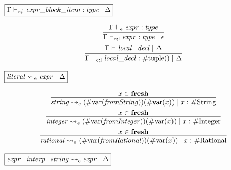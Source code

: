 $\fbox{$\Gamma \vdash_{\mathrm{e}; \mathrm{l}} \mathit{expr\_block\_item}: \mathit{type} \mid \Delta$}$

\begin{gather*}
    \infer{\Gamma \vdash_{\mathrm{e}; \mathrm{l}} \mathit{expr}: \mathit{type} \mid \epsilon}{
        \Gamma \vdash_\mathrm{e} \mathit{expr}: \mathit{type}
    }
    \\
    \infer{\Gamma \vdash_{\mathrm{e}; \mathrm{l}} \mathit{local\_decl}: \mathrm{\#tuple}() \mid \Delta}{
        \Gamma \vdash \mathit{local\_decl} \mid \Delta
    }
\end{gather*}

$\fbox{$\mathit{literal} \rightsquigarrow_\mathrm{e} \mathit{expr} \mid \Delta$}$

\begin{gather*}
    \infer{\mathit{string} \rightsquigarrow_\mathrm{e} (\mathrm{\#var}(\mathit{fromString}))(\mathrm{\#var}(x)) \mid x: \mathrm{\#String}}{
        x \in \mathbf{fresh}
    }
    \\
    \infer{\mathit{integer} \rightsquigarrow_\mathrm{e} (\mathrm{\#var}(\mathit{fromInteger}))(\mathrm{\#var}(x)) \mid x: \mathrm{\#Integer}}{
        x \in \mathbf{fresh}
    }
    \\
    \infer{\mathit{rational} \rightsquigarrow_\mathrm{e} (\mathrm{\#var}(\mathit{fromRational}))(\mathrm{\#var}(x)) \mid x: \mathrm{\#Rational}}{
        x \in \mathbf{fresh}
    }
\end{gather*}

$\fbox{$\mathit{expr\_interp\_string} \rightsquigarrow_\mathrm{e} \mathit{expr} \mid \Delta$}$

